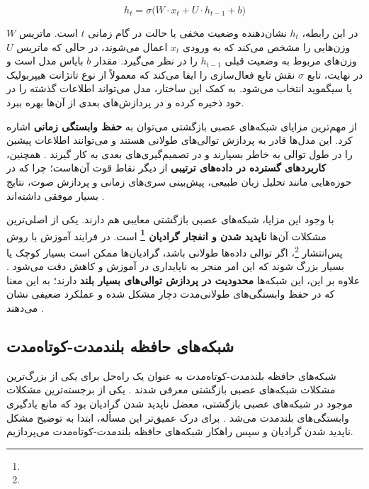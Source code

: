 \begin{equation}
	h_t = \sigma \big( W \cdot x_t + U \cdot h_{t-1} + b \big)
\end{equation}

در این رابطه، \( h_t \) نشان‌دهنده وضعیت مخفی یا حالت در گام زمانی \( t \) است. ماتریس \( W \) وزن‌هایی را مشخص می‌کند که به ورودی \( x_t \) اعمال می‌شوند، در حالی که ماتریس \( U \) وزن‌های مربوط به وضعیت قبلی \( h_{t-1} \) را در نظر می‌گیرد. مقدار \( b \) بایاس مدل است و در نهایت، تابع \(\sigma\) نقش تابع فعال‌سازی را ایفا می‌کند که معمولاً از نوع تانژانت هیپربولیک یا سیگموید انتخاب می‌شود. به کمک این ساختار، مدل می‌تواند اطلاعات گذشته را در خود ذخیره کرده و در پردازش‌های بعدی از آن‌ها بهره ببرد.  


از مهم‌ترین مزایای شبکه‌های عصبی بازگشتی می‌توان به \textbf{حفظ وابستگی زمانی} اشاره کرد. این مدل‌ها قادر به پردازش توالی‌های طولانی هستند و می‌توانند اطلاعات پیشین را در طول توالی به خاطر بسپارند و در تصمیم‌گیری‌های بعدی به کار گیرند \cite{elman1990finding}. همچنین، \textbf{کاربردهای گسترده در داده‌های ترتیبی} از دیگر نقاط قوت آن‌هاست؛ چرا که در حوزه‌هایی مانند تحلیل زبان طبیعی، پیش‌بینی سری‌های زمانی و پردازش صوت، نتایج بسیار موفقی داشته‌اند \cite{gers1999learning}.  

با وجود این مزایا، شبکه‌های عصبی بازگشتی معایبی هم دارند. یکی از اصلی‌ترین مشکلات آن‌ها \textbf{ناپدید شدن و انفجار گرادیان \footnote{}} است. در فرایند آموزش با روش پس‌انتشار \footnote{}، اگر توالی داده‌ها طولانی باشد، گرادیان‌ها ممکن است بسیار کوچک یا بسیار بزرگ شوند که این امر منجر به ناپایداری در آموزش و کاهش دقت می‌شود \cite{hochreiter1998vanishing}. علاوه بر این، این شبکه‌ها \textbf{محدودیت در پردازش توالی‌های بسیار بلند} دارند؛ به این معنا که در حفظ وابستگی‌های طولانی‌مدت دچار مشکل شده و عملکرد ضعیفی نشان می‌دهند \cite{hochreiter1997long,goodfellow2016deep}.

\subsection{شبکه‌های حافظه بلندمدت-کوتاه‌مدت}

شبکه‌های حافظه بلندمدت-کوتاه‌مدت به عنوان یک راه‌حل برای یکی از بزرگ‌ترین مشکلات شبکه‌های عصبی بازگشتی معرفی شدند
\cite{hochreiter1997long}.
یکی از برجسته‌ترین مشکلات موجود در شبکه‌های عصبی بازگشتی، معضل ناپدید شدن گرادیان  بود که مانع یادگیری وابستگی‌های بلندمدت می‌شد
\cite{hochreiter1998vanishing,goodfellow2016deep}.
برای درک عمیق‌تر این مسأله، ابتدا به توضیح مشکل ناپدید شدن گرادیان و سپس راهکار شبکه‌های حافظه بلندمدت-کوتاه‌مدت می‌پردازیم.

